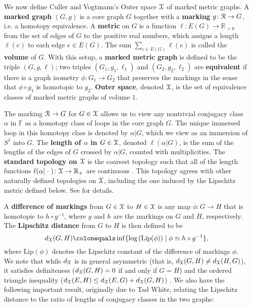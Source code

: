 \documentclass[letterpaper,fleqn]{article}
\theoremstyle{plain}
\theoremstyle{definition}
\newcommand{\define}[1]{\textbf{#1}}
\newcommand{\R}{\mathbb{R}}
\newcommand{\inv}{^{-1}}
\newcommand{\free}{\mathbb{F}} %
\newcommand{\os}{{\EuScript X}} %
\newcommand{\X}{\os}
\newcommand{\rose}{{\EuScript R}} %
\begin{document}
We now define Culler and Vogtmann's \cite{CVouter} Outer space $\os$ of marked metric graphs. A \define{marked graph} $(G, g)$ is a core graph $G$ together with a \define{marking} $g\colon \rose \to G$, i.e. a homotopy equivalence. A \define{metric} on $G$ is a function $\ell\colon E(G) \to \R_{> 0}$ from the set of edges of $G$ to the positive real numbers, which assigns a length $\ell(e)$ to each edge $e \in E(G)$. The sum $\sum_{e\in E(G)} \ell(e)$ is called the \define{volume} of $G$.
With this setup, a \define{marked metric graph} is defined to be the triple $(G,g,\ell)$;  two triples $(G_1,g_1,\ell_1)$ and $(G_2,g_2,\ell_2)$ are \define{equivalent} if there is a graph isometry $\phi\colon G_1 \to G_2$ that preserves the markings in the sense that $\phi \circ g_1$ is homotopic to $g_2$. \define{Outer space}, denoted $\X$, is the set of equivalence classes of marked metric graphs of volume $1$.

The marking $\rose\to G$ for $G\in \os$ allows us to view any nontrivial conjugacy class $\alpha$ in $\free$ as a homotopy class of loops in the core graph $G$. The unique immersed loop in this homotopy class is denoted by $\alpha\vert G$, which we view as an immersion of $S^1$ into $G$. 
The \define{length of $\alpha$ in $G\in \os$}, denoted $\ell(\alpha\vert G)$, is the sum of the lengths of the edges of $G$ crossed by $\alpha\vert G$, counted with multiplicities. The \define{standard topology on $\os$} is the coarsest topology such that all of the length functions $\ell(\alpha\vert\;\cdot\;)\colon \os \to \R_+$ are continuous \cite{CVouter}. This topology agrees with other naturally defined topologies on $\X$, including the one induced by the Lipschitz metric defined below. See \cite{CVouter, paulin1989gromov, FMout} for details.

A \define{difference of markings} from $G\in \os$ to $H\in\os$ is any map $\phi\colon G\to H$ that is homotopic to $h\circ g\inv$, where $g$ and $h$ are the markings on $G$ and $H$, respectively. The \define{Lipschitz distance} from $G$ to $H$ is then defined to be
\[d_{\X}(G,H) \colonequals \inf \{ \log\left(\mathrm{Lip}(\phi)\right) \mid \phi \simeq h \circ g^{-1}\},\]
where $\mathrm{Lip}(\phi)$ denotes the Lipschitz constant of the difference of markings $\phi$. We note that while $d_\os$ is in general asymmetric (that is, $d_\os(G,H)\neq d_\os(H,G)$), it satisfies definiteness ($d_\os(G,H) = 0$ if and only if $G=H$) and the ordered triangle inequality ($d_\os(E,H) \leq d_\os(E,G) + d_\os(G,H)$) \cite{FMout}. We also have the following important result, originally due to Tad White, relating the Lipschitz distance to the ratio of lengths of conjugacy classes in the two graphs:
\end{document}
